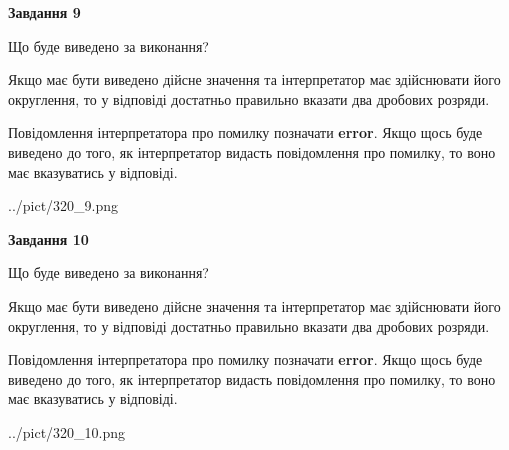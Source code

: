 \documentclass[12pt, ukrainian]{article}
\begin{document}
{\begin {Large}
{\begin {center}\textbf{Завдання 9}\end {center}}\par
Що буде виведено за виконання? \par

Якщо має бути виведено дійсне значення та інтерпретатор має здійснювати його округлення, 
то у відповіді достатньо правильно вказати два дробових розряди.

Повідомлення інтерпретатора про помилку позначати \textbf{error}.
Якщо щось буде виведено до того, як інтерпретатор видасть повідомлення про помилку, 
то воно має вказуватись у відповіді. \par

\begin{center}
	{../pict/320_9.png}
\end{center}
\newpage

{\begin {center}\textbf{Завдання 10}\end {center}}\par
Що буде виведено за виконання? \par

Якщо має бути виведено дійсне значення та інтерпретатор має здійснювати його округлення, 
то у відповіді достатньо правильно вказати два дробових розряди.

Повідомлення інтерпретатора про помилку позначати \textbf{error}.
Якщо щось буде виведено до того, як інтерпретатор видасть повідомлення про помилку, 
то воно має вказуватись у відповіді. \par

\begin{center}
	{../pict/320_10.png}
\end{center}
\newpage

\end {Large}}
\end{document}
